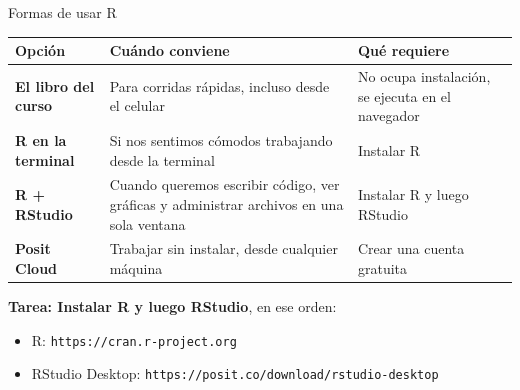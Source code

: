 \documentclass[aspectratio=169,10pt]{beamer}
\newcommand{\destaca}[1]{%
  \par\vspace{3pt}\noindent
  \colorbox{azulClaro}{%
    \parbox{\dimexpr\linewidth-2\fboxsep\relax}{\vspace{3pt}#1\vspace{3pt}}}%
  \par\vspace{3pt}}
\begin{document}
\begin{frame}{Formas de usar R}
  \begin{center}
  {\small
  \begin{tabular}{@{}p{3.1cm}p{4.7cm}p{4.4cm}@{}}
    \toprule
    \textbf{Opción} & \textbf{Cuándo conviene} & \textbf{Qué requiere} \\
    \midrule
    \textbf{El libro del curso} & Para corridas rápidas, incluso desde el celular &
      No ocupa instalación, se ejecuta en el navegador \\
    \textbf{R en la terminal} & Si nos sentimos cómodos trabajando desde la terminal &
      Instalar R \\
    \textbf{R + RStudio} & Cuando queremos escribir código, ver gráficas y administrar archivos en una sola ventana &
    Instalar R y luego RStudio \\
          \textbf{Posit Cloud} & Trabajar sin instalar, desde cualquier máquina &
      Crear una cuenta gratuita \\
    \bottomrule
  \end{tabular}}
  \end{center}

  \vspace{5mm}
  \destaca{
   \textbf{Tarea: Instalar R y luego RStudio}, en ese orden:
  \begin{itemize}
    \item R: \texttt{https://cran.r-project.org}
    \item RStudio Desktop: \texttt{https://posit.co/download/rstudio-desktop}
    \end{itemize}}
\end{frame}

\end{document}
